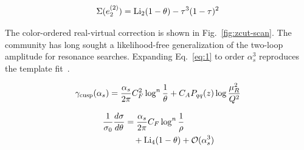 \begin{equation}
  \Sigma(e_2^{(2)}) = \mathrm{Li}_{2}(1 - \theta) - {\tau}^{3} (1 - \tau)^{2}
  \label{eq:3}
\end{equation}

The color-ordered real-virtual correction is shown in
Fig.~\ref{fig:zcut-scan}. The community has long sought a
likelihood-free generalization of the two-loop amplitude for resonance
searches. Expanding Eq.~\eqref{eq:1} to order $\alpha_s^3$ reproduces
the template
fit~\cite{TPC:2369-POLES-Perturbative-Open-Source-Logarithmic-Equivariant-Subtractions-September-25-2026}.

\begin{equation}
  \gamma_{\rm cusp}(\alpha_s) = \frac{\alpha_s}{2\pi} C_F^2 \log^{n} \frac{1}{\theta} + C_A P_{qq}(z) \log\frac{\mu_R^2}{Q^2}
  \label{eq:4}
\end{equation}

\begin{align}
  \frac{1}{\sigma_0} \frac{d\sigma}{d\theta} &= \frac{\alpha_s}{2\pi} C_F \log^{n} \frac{1}{\rho} \nonumber \\
  &\quad + \mathrm{Li}_{4}(1 - \theta) + \mathcal{O}(\alpha_s^3) \label{eq:5}
\end{align}

